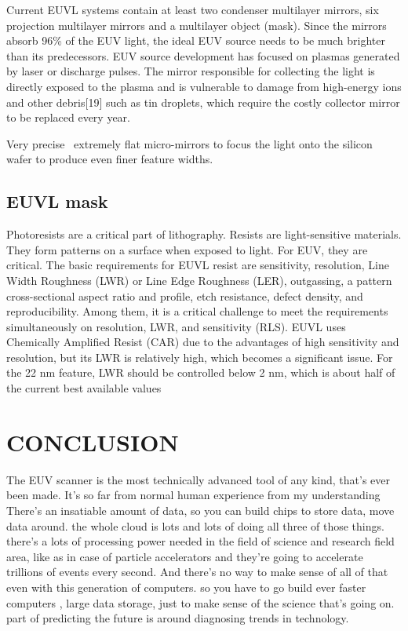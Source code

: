 \documentclass[12pt,a4paper]{report}
\begin{document}
Current EUVL systems contain at least two 
condenser multilayer mirrors, six projection multilayer 
mirrors and a multilayer object (mask). Since 
the mirrors absorb 96\% of the EUV light, the ideal 
EUV source needs to be much brighter than its 
predecessors. EUV source development has focused on 
plasmas generated by laser or discharge pulses. 
The mirror responsible for collecting the light is 
directly exposed to the plasma and is vulnerable 
to damage from high-energy ions and other 
debris[19] such as tin droplets, which require 
the costly collector mirror to be replaced every year.

Very precise  extremely flat micro-mirrors to 
focus the light onto the silicon wafer to 
produce even finer feature widths.





\section{EUVL mask}

Photoresists are a critical part of lithography. Resists are 
light-sensitive materials. 
They form patterns on a surface when exposed to light. For EUV, 
they are critical.
The basic requirements for EUVL resist are sensitivity, 
resolution, Line Width Roughness 
(LWR) or Line Edge Roughness (LER), outgassing, a pattern 
cross-sectional aspect ratio 
and profile, etch resistance, defect density, and 
reproducibility. Among them, 
it is a critical challenge to meet the requirements 
simultaneously on resolution, 
LWR, and sensitivity (RLS). EUVL uses Chemically Amplified 
Resist (CAR) due to 
the advantages of high sensitivity and resolution, but its 
LWR is relatively high, 
which becomes a significant issue. For the 22 nm feature, 
LWR should be 
controlled below 2 nm, which is about half of the current 
best available values



\chapter{CONCLUSION}
The EUV scanner is the most technically advanced tool of any kind, that's ever been made. It's so far from
normal human experience from my understanding
There's an insatiable amount of data, so you can build chips to store data, move data around. the whole cloud is lots
and lots of doing all three of those things. 
there's a lots of processing power needed in the field of science and research field area, like as in case 
of  particle
accelerators and they're going to accelerate trillions of events every second. And there's no way to make 
sense of all of that even with this generation of computers. so you have to go build ever faster computers
, large data storage, just to make sense of the science that's going on. part of predicting the future is around
diagnosing trends in technology.
\end{document}
